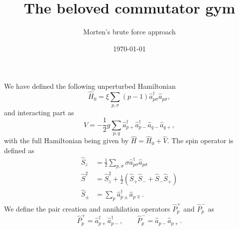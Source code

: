 \documentclass[a4paper,11pt,twoside]{article}
\title{The beloved commutator gym}
\author{Morten's brute force approach}
\date{\today}
\begin{document}
\maketitle

We have defined the following unperturbed Hamiltonian
\begin{equation}
\hat H_0 = \xi \sum_{p,\sigma} (p-1) \hat a_{p\sigma}^\dagger \hat a_{p\sigma},
\label{eq:H_0}
\end{equation}
%
and interacting part as
\begin{equation}
\hat V = -\frac{1}{2} g \sum_{p,q} \hat a_{p+}^\dagger \hat a_{p-}^\dagger \hat a_{q-} \hat a_{q+} ,\label{eq:V}
\end{equation}
with the full Hamiltonian being given by $\hat H = \hat H_0 + \hat V$. The spin operator is defined as 
\begin{align}
\hat S_z &= \frac{1}{2} \sum_{p,\sigma} \sigma \hat a_{p\sigma}^\dagger \hat a_{p\sigma}
\label{eq:S_z} \\
%
\hat S^2 &= \hat S_z^2 + \frac{1}{2} \left( \hat S_+ \hat S_- + \hat S_- \hat S_+ \right)
\label{eq:S^2} \\
%
\hat S_\pm &= \sum_p \hat a_{p\pm}^\dagger \hat a_{p\mp}
\label{eq:S_pm}.
\end{align}
%
We define the pair creation and annihilation operators $\hat P_p^+$ and $\hat P_p^-$ as
\begin{equation}
\hat P_p^+ = \hat a_{p+}^\dagger \hat a_{p-}^\dagger, \qquad
\hat P_p^- = \hat a_{p-} \hat a_{p+} .
\label{eq:P}
\end{equation}

\end{document}
